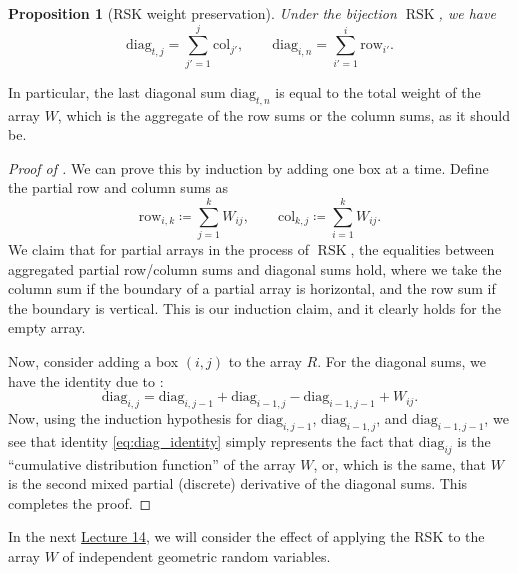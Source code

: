 \documentclass[letterpaper,11pt,oneside,reqno]{article}
\numberwithin{equation}{section}
\newtheorem{proposition}{Proposition}[section]
\theoremstyle{definition}
\begin{document}
\begin{proposition}[RSK weight preservation]
	\label{prop:RSK_weight_preservation}
	Under the bijection $\operatorname{RSK}$, we have
	\begin{equation*}
		\mathrm{diag}_{t,j}=\sum_{j'=1}^j\mathrm{col}_{j'},\qquad
		\mathrm{diag}_{i,n}=\sum_{i'=1}^i\mathrm{row}_{i'}.
	\end{equation*}
\end{proposition}
In particular, the last diagonal sum $\mathrm{diag}_{t,n}$
is equal to the total weight of the array $W$, which is the
aggregate of the row sums or the column sums, as it should
be.
\begin{proof}[Proof of ]
	We can prove this by induction by adding one box at a time.
	Define the partial row and column sums
	as
	\begin{equation*}
		\mathrm{row}_{i,k}\coloneqq \sum_{j=1}^k W_{ij}, \qquad
		\mathrm{col}_{k,j} \coloneqq \sum_{i=1}^k W_{ij}.
	\end{equation*}
	We claim that for partial arrays in the process of $\operatorname{RSK}$,
	the equalities between aggregated partial row/column sums and diagonal sums hold,
	where we take the column sum if the boundary of a partial array is horizontal,
	and the row sum if the boundary is vertical. This is our induction
	claim, and it clearly holds for the empty array.

	Now, consider adding a box $(i,j)$ to the array $R$.
	For the diagonal sums, we have the identity
	due to :
	\begin{equation}
		\label{eq:diag_identity}
		\mathrm{diag}_{i,j} = \mathrm{diag}_{i,j-1} + \mathrm{diag}_{i-1,j} - \mathrm{diag}_{i-1,j-1} + W_{ij}.
	\end{equation}
	Now, using the induction hypothesis for 
	$\mathrm{diag}_{i,j-1}$, $\mathrm{diag}_{i-1,j}$,
	and $\mathrm{diag}_{i-1,j-1}$, we see that 
	identity \eqref{eq:diag_identity} 
	simply represents the fact that
	$\mathrm{diag}_{ij}$ is the ``cumulative distribution function'' of the
	array $W$, or, which is the same, that $W$ is the second 
	mixed partial (discrete) derivative of the diagonal sums.
	This completes the proof.
\end{proof}

In the next
\href{https://lpetrov.cc/rmt25/rmt25-notes/rmt2025-l14.pdf}{Lecture
14}, we will consider the effect of applying the RSK
to the array $W$ of independent geometric random variables.
\end{document}
